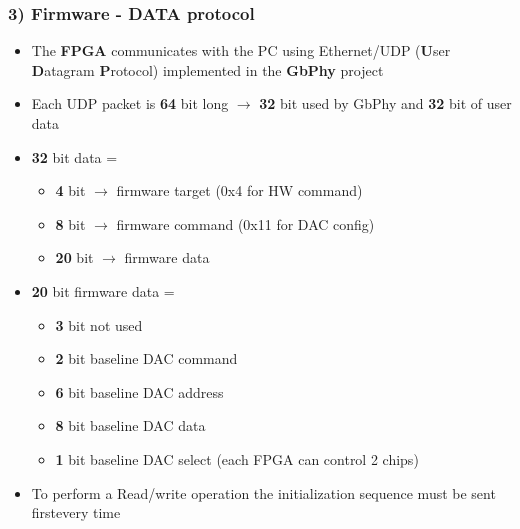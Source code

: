 \documentclass[aspectratio=169]{beamer}
\begin{document}
	\begin{frame}
	\frametitle{3) Firmware - DATA protocol}
	\begin{itemize}
		\item The \textbf{FPGA} communicates with the PC using Ethernet/UDP (\textbf{U}ser \textbf{D}atagram \textbf{P}rotocol) implemented in the \textbf{GbPhy} project
		\item Each UDP packet is \textbf{64} bit long $\rightarrow$ \textbf{32} bit used by GbPhy and \textbf{32} bit of user data
		\item \textbf{32} bit data =
		\begin{itemize}
			\item \textbf{4} bit $\rightarrow$ firmware target (0x4 for HW command)
			\item \textbf{8} bit $\rightarrow$ firmware command (0x11 for DAC config)
			\item \textbf{20} bit $\rightarrow$ firmware data
		\end{itemize}
		\item \textbf{20} bit firmware data =
		\begin{itemize}
			\item \textbf{3} bit not used
			\item \textbf{2} bit baseline DAC command
			\item \textbf{6} bit baseline DAC address
			\item \textbf{8} bit baseline DAC data
			\item \textbf{1} bit baseline DAC select (each FPGA can control 2 chips)
		\end{itemize}
		\item To perform a Read/write operation the initialization sequence must be sent first\newline every time
	\end{itemize}
	\end{frame}
\end{document}
